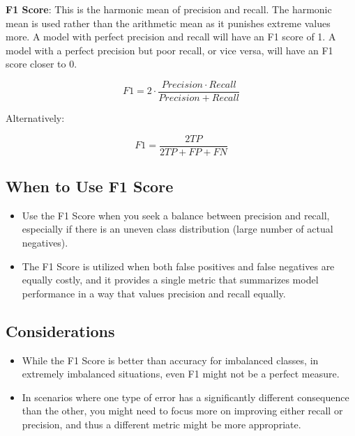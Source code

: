 \textbf{F1 Score}: This is the harmonic mean of precision and recall. The harmonic mean is used rather than the arithmetic mean as it punishes extreme values more. A model with perfect precision and recall will have an F1 score of 1. A model with a perfect precision but poor recall, or vice versa, will have an F1 score closer to 0.

\[
    F1 = 2 \cdot \frac{Precision \cdot Recall}{Precision + Recall}
\]

Alternatively:

\[
    F1 = \frac{2TP}{2TP + FP + FN}
\]

\subsection*{When to Use F1 Score}

\begin{itemize}
    \item Use the F1 Score when you seek a balance between precision and recall, especially if there is an uneven class distribution (large number of actual negatives).
    \item The F1 Score is utilized when both false positives and false negatives are equally costly, and it provides a single metric that summarizes model performance in a way that values precision and recall equally.
\end{itemize}

\subsection*{Considerations}

\begin{itemize}
    \item While the F1 Score is better than accuracy for imbalanced classes, in extremely imbalanced situations, even F1 might not be a perfect measure.
    \item In scenarios where one type of error has a significantly different consequence than the other, you might need to focus more on improving either recall or precision, and thus a different metric might be more appropriate.
\end{itemize}


